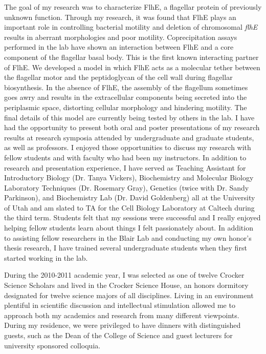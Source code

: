 \documentclass[12pt]{report}
\begin{document}
\indent The goal of my research was to characterize FlhE, a flagellar protein of previously unknown function. Through my research, it was found that FlhE plays an important role in controlling bacterial motility and deletion of chromosomal {\it flhE} results in aberrant morphologies and poor motility. Coprecipitation assays performed in the lab have shown an interaction between FlhE and a core component of the flagellar basal body. This is the first known interacting partner of FlhE. We developed a model in which FlhE acts as a molecular tether between the flagellar motor and the peptidoglycan of the cell wall during flagellar biosynthesis. In the absence of FlhE, the assembly of the flagellum sometimes goes awry and results in the extracellular components being secreted into the periplasmic space, distorting cellular morphology and hindering motility. The final details of this model are currently being tested by others in the lab. I have had the opportunity to present both oral and poster presentations of my research results at research symposia attended by undergraduate and graduate students, as well as professors. I enjoyed those opportunities to discuss my research with fellow students and with faculty who had been my instructors. In addition to research and presentation experience, I have served as Teaching Assistant for Introductory Biology (Dr. Tanya Vickers), Biochemistry and Molecular Biology Laboratory Techniques (Dr. Rosemary Gray), Genetics (twice with Dr. Sandy Parkinson), and Biochemistry Lab (Dr. David Goldenberg) all at the University of Utah and am slated to TA for the Cell Biology Laboratory at Caltech during the third term. Students felt that my sessions were successful and I really enjoyed helping fellow students learn about things I felt passionately about. In addition to assisting fellow researchers in the Blair Lab and conducting my own honor's thesis research, I have trained several undergraduate students when they first started working in the lab.
\newpage

\indent During the 2010-2011 academic year, I was selected as one of twelve Crocker Science Scholars and lived in the Crocker Science House, an honors dormitory designated for twelve science majors of all disciplines. Living in an environment plentiful in scientific discussion and intellectual stimulation allowed me to approach both my academics and research from many different viewpoints. During my residence, we were privileged to have dinners with distinguished guests, such as the Dean of the College of Science and guest lecturers for university sponsored colloquia.  
\end{document}
